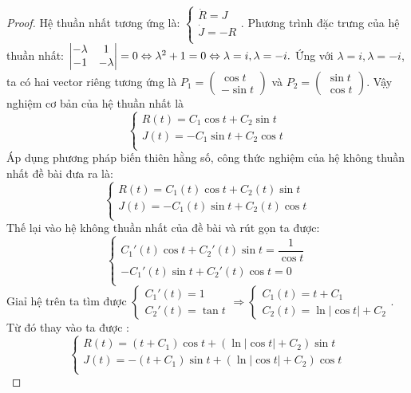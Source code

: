 \documentclass[a4paper]{article}
\begin{document}
\begin{proof}
    Hệ thuần nhất tương ứng là: $
    \begin{cases}
    \dot{R}=J \\
    \dot{J}=-R \\
    \end{cases}
    $.
Phương trình đặc trưng của hệ thuần nhất: 
    $\begin{vmatrix}
 - \lambda & 1 \\
-1 &  - \lambda
\end{vmatrix} = 0 \Leftrightarrow \lambda^{2} + 1 = 0 \Leftrightarrow \lambda = i, \lambda = -i.\\$
Ứng với $\lambda = i, \lambda = -i$, ta có hai vector riêng tương ứng là $P_1 = \begin{pmatrix}
    \cos{t} \\
    -\sin{t}
\end{pmatrix}$ và $P_2 = \begin{pmatrix}
    \sin{t} \\ 
    \cos{t}
\end{pmatrix}$.
Vậy nghiệm cơ bản của hệ thuần nhất là 
$$\begin{cases}
    R(t) =  C_1\cos{t} +  C_2\sin{t} \\
    J(t) =  -C_1\sin{t} +  C_2\cos{t}\\
    \end{cases} $$
Áp dụng phương pháp biến thiên hằng số, công thức nghiệm của hệ không thuần nhất đề bài đưa ra là: 
$$\begin{cases}
    R(t) =  C_1(t)\cos{t} +  C_2(t)\sin{t} \\
    J(t) =  -C_1(t)\sin{t} +  C_2(t)\cos{t}\\
    \end{cases} $$
 Thế lại vào hệ không thuần nhất của đề bài và rút gọn ta được: 
 $$\begin{cases}
    C_1'(t)\cos{t} +  C_2'(t)\sin{t} = \dfrac{1}{\cos{t}} \\
   -C_1'(t)\sin{t} +  C_2'(t)\cos{t} = 0\\
    \end{cases} $$
 Giaỉ hệ trên ta tìm được $\begin{cases}
     C_1'(t) = 1\\
     C_2'(t) = \tan t
 \end{cases}\Rightarrow \begin{cases}
     C_1(t) = t + C_1\\
     C_2(t) = \ln{\vert\cos{t} \vert} + C_2
 \end{cases}$.
 \newline
 Từ đó thay vào ta được :$$\begin{cases}
    R(t) =  (t + C_1)\cos{t} +  (\ln{\vert\cos{t} \vert} + C_2)\sin{t} \\
    J(t) =  -(t + C_1)\sin{t} +  (\ln{\vert\cos{t} \vert} + C_2)\cos{t} \\
    \end{cases} $$
    

\end{proof}
\end{document}
